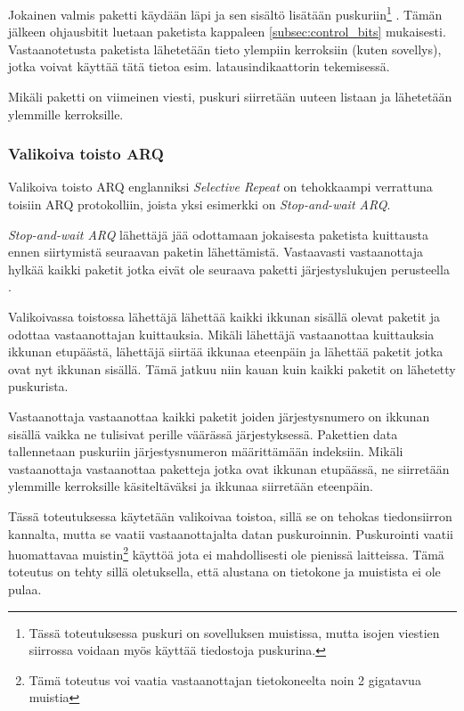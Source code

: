 \documentclass[a4paper,12pt]{article}
\begin{document}
    Jokainen valmis paketti käydään läpi ja sen sisältö lisätään puskuriin\footnote{Tässä toteutuksessa puskuri on sovelluksen muistissa, mutta isojen viestien siirrossa voidaan myös käyttää tiedostoja puskurina.}
    . Tämän jälkeen ohjausbitit luetaan paketista kappaleen \ref{subsec:control_bits} mukaisesti. Vastaanotetusta paketista lähetetään tieto ylempiin kerroksiin (kuten sovellys), jotka voivat käyttää tätä tietoa esim. latausindikaattorin tekemisessä. \par

    Mikäli paketti on viimeinen viesti, puskuri siirretään uuteen listaan ja lähetetään ylemmille kerroksille.

    \subsubsection{Valikoiva toisto ARQ}\label{subsec:valikoiva_toisto}
    Valikoiva toisto ARQ englanniksi \textit{Selective Repeat} on tehokkaampi verrattuna toisiin ARQ protokolliin, joista yksi esimerkki on \textit{Stop-and-wait ARQ}.

    \begin{framed}
        \textit{Stop-and-wait ARQ} lähettäjä jää odottamaan jokaisesta paketista kuittausta ennen siirtymistä seuraavan paketin lähettämistä. Vastaavasti vastaanottaja hylkää kaikki paketit jotka eivät ole seuraava paketti järjestyslukujen perusteella \cite{StopAndWaitARQ}.
    \end{framed}

    Valikoivassa toistossa lähettäjä lähettää kaikki ikkunan sisällä olevat paketit ja odottaa vastaanottajan kuittauksia. Mikäli lähettäjä vastaanottaa kuittauksia ikkunan etupäästä, lähettäjä siirtää ikkunaa eteenpäin ja lähettää paketit jotka ovat nyt ikkunan sisällä. Tämä jatkuu niin kauan kuin kaikki paketit on lähetetty puskurista. \par

    Vastaanottaja vastaanottaa kaikki paketit joiden järjestysnumero on ikkunan sisällä vaikka ne tulisivat perille väärässä järjestyksessä. Pakettien data tallennetaan puskuriin järjestysnumeron määrittämään indeksiin. Mikäli vastaanottaja vastaanottaa paketteja jotka ovat ikkunan etupäässä, ne siirretään ylemmille kerroksille käsiteltäväksi ja ikkunaa siirretään eteenpäin.

    Tässä toteutuksessa käytetään valikoivaa toistoa, sillä se on tehokas tiedonsiirron kannalta, mutta se vaatii vastaanottajalta datan puskuroinnin. Puskurointi vaatii huomattavaa muistin\footnote{Tämä toteutus voi vaatia vastaanottajan tietokoneelta noin 2 gigatavua muistia} käyttöä jota ei mahdollisesti ole pienissä laitteissa. Tämä toteutus on tehty sillä oletuksella, että alustana on tietokone ja muistista ei ole pulaa.\par
\end{document}

